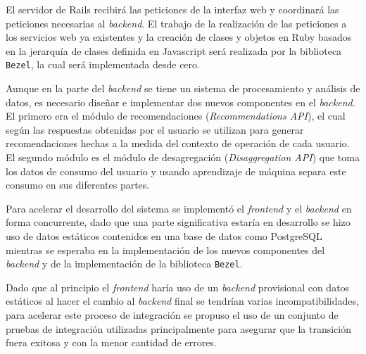 El servidor de Rails recibirá las peticiones de la interfaz web y
coordinará las peticiones necesarias al \textit{backend}. El trabajo
de la realización de las peticiones a los servicios web ya existentes
y la creación de clases y objetos en Ruby basados en la jerarquía de clases
definida en Javascript será realizada por la biblioteca \texttt{Bezel},
la cual será implementada desde cero.

Aunque en la parte del \textit{backend} se tiene un sistema de procesamiento
y análisis de datos, es necesario diseñar e implementar dos nuevos componentes
en el \textit{backend}. El primero era el módulo de recomendaciones
(\textit{Recommendations API}), el cual según las respuestas obtenidas por el
usuario se utilizan para generar recomendaciones hechas a la medida del
contexto de operación de cada usuario. El segundo módulo es el módulo de
desagregación (\textit{Disaggregation API}) que toma los datos de consumo
del usuario y usando aprendizaje de máquina separa este consumo en sus
diferentes partes.

Para acelerar el desarrollo del sistema se implementó el \textit{frontend}
y el \textit{backend} en forma concurrente, dado que una parte significativa
estaría en desarrollo se hizo uso de datos estáticos contenidos en una base de datos
como PostgreSQL mientras se esperaba en la implementación de los nuevos
componentes del \textit{backend} y de la implementación de la biblioteca
\texttt{Bezel}.

Dado que al principio el \textit{frontend} haría uso de un \textit{backend}
provisional con datos estáticos al hacer el cambio al \textit{backend} final
se tendrían varias incompatibilidades, para acelerar este proceso de integración
se propuso el uso de un conjunto de pruebas de integración utilizadas
principalmente para asegurar que la transición fuera exitosa y con la menor
cantidad de errores.
